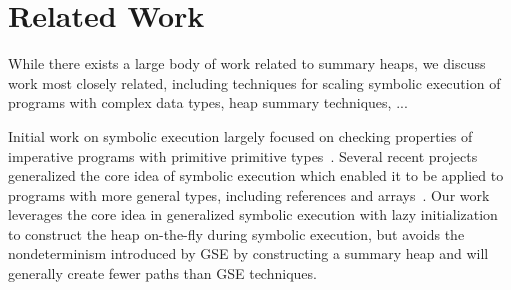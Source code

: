 \section{Related Work}
\label{related}

While there exists a large body of work related to summary heaps,
we discuss work most closely related, including techniques for
scaling symbolic execution of programs with complex data types,
heap summary techniques, ...


Initial work on symbolic execution largely focused on checking 
properties of imperative programs with primitive
primitive types~\cite{Clarke:76,King:76}. Several recent projects 
generalized the core
idea of symbolic execution which enabled it to be applied to
programs with more general types, including references and 
arrays~\cite{GSE03,Godefroid:PLDI05,Sen:FSE05,CadarEngler05EXE,KiasanKunit}.
Our work leverages the core idea in generalized symbolic execution
with lazy initialization to construct the heap on-the-fly during symbolic
execution, but avoids the nondeterminism introduced by GSE by
constructing a summary heap and will generally create fewer paths
than GSE techniques.


